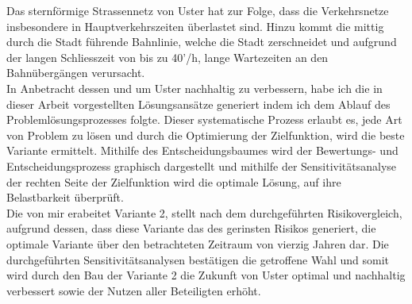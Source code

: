 Das sternförmige Strassennetz von Uster hat zur Folge, dass die Verkehrsnetze insbesondere in Hauptverkehrszeiten überlastet sind. Hinzu kommt die mittig durch die Stadt führende Bahnlinie, welche die Stadt zerschneidet und aufgrund der langen Schliesszeit von bis zu 40’/h, lange Wartezeiten an den Bahnübergängen verursacht. \\
In Anbetracht dessen und um Uster nachhaltig zu verbessern, habe ich die in dieser Arbeit vorgestellten Lösungsansätze generiert indem ich dem Ablauf des Problemlösungsprozesses folgte. Dieser systematische Prozess erlaubt es, jede Art von Problem zu lösen und durch die Optimierung der Zielfunktion, wird die beste Variante ermittelt. Mithilfe des Entscheidungsbaumes wird der Bewertungs- und Entscheidungsprozess graphisch dargestellt und mithilfe der Sensitivitätsanalyse der rechten Seite der Zielfunktion wird die optimale Lösung, auf ihre Belastbarkeit überprüft. \\
Die von mir erabeitet Variante 2, stellt nach dem durchgeführten Risikovergleich, aufgrund dessen, dass diese Variante das des gerinsten Risikos generiert, die optimale Variante über den betrachteten Zeitraum von vierzig Jahren dar. Die durchgeführten Sensitivitätsanalysen bestätigen die getroffene Wahl und somit wird durch den Bau der Variante 2 die Zukunft von Uster optimal und nachhaltig verbessert sowie der Nutzen aller Beteiligten erhöht. 



 



 



%

